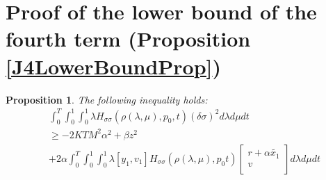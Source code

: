 \documentclass[a4paper,10pt]{article}
\newtheorem{proposition}{Proposition}
\begin{document}
\section{Proof of the lower bound of the fourth term (Proposition 
\ref{J4LowerBoundProp})}\label{J4LowerBoundProof}
\begin{proposition}\label{J4LowerBound0Prop}
    The following inequality holds:
\begin{equation}
	\label{J4LowerBound0}
	\begin{split}
            &\int_{0}^{T} \int_{0}^{1} \int_{0}^{1} \lambda H_{\sigma 
        \sigma}(\rho(\lambda,\mu),p_{0},t)(\delta \sigma)^{2}  
        d \lambda d \mu dt  \\ 
		&\geq  
        -2KTM^{2} \alpha^{2} + \beta z^{2} 
	\\
        &+ 2\alpha \int_{0}^{T} \int_{0}^{1} \int_{0}^{1} \lambda \left[y_{1},v_{1}\right]
	H_{\sigma \sigma}(\rho(\lambda,\mu),p_{0}t)
        \left[
        \begin{array}
        {c}
            r+\alpha\tilde{x_{1}}  \\
            v  \\
        \end{array}
        \right] d \lambda d \mu dt
  		\end{split}
\end{equation}
\end{proposition}
\end{document}
